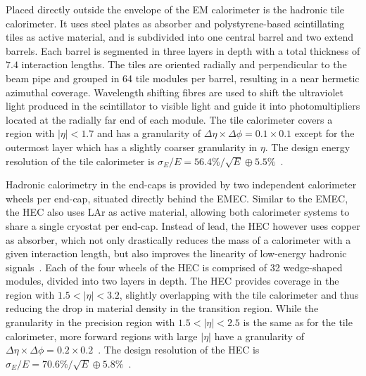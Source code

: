 Placed directly outside the envelope of the EM calorimeter is the hadronic tile calorimeter. It uses steel plates as absorber and polystyrene-based scintillating tiles as active material, and is subdivided into one central barrel and two extend barrels. Each barrel is segmented in three layers in depth with a total thickness of $7.4$ interaction lengths. The tiles are oriented radially and perpendicular to the beam pipe and grouped in 64 tile modules per barrel, resulting in a near hermetic azimuthal coverage. Wavelength shifting fibres are used to shift the ultraviolet light produced in the scintillator to visible light and guide it into photomultipliers located at the radially far end of each module. The tile calorimeter covers a region with $\vert\eta\vert <1.7$ and has a granularity of $\Delta \eta \times \Delta \phi = 0.1 \times 0.1$ except for the outermost layer which has a slightly coarser granularity in $\eta$. The design energy resolution of the tile calorimeter is $\sigma_E / E = 56.4\% / \sqrt{E} \oplus 5.5\%$~\cite{Aad:2008zzm}.

Hadronic calorimetry in the end-caps is provided by two independent calorimeter wheels per end-cap, situated directly behind the EMEC. Similar to the EMEC, the HEC also uses LAr as active material, allowing both calorimeter systems to share a single cryostat per end-cap. Instead of lead, the HEC however uses copper as absorber, which not only drastically reduces the mass of a calorimeter with a given interaction length, but also improves the linearity of low-energy hadronic signals~\cite{Lee:2637852}. Each of the four wheels of the HEC is comprised of 32 wedge-shaped modules, divided into two layers in depth. The HEC provides coverage in the region with $1.5 < \vert\eta\vert <3.2$, slightly overlapping with the tile calorimeter and thus reducing the drop in material density in the transition region. While the granularity in the precision region with $1.5 < \vert\eta\vert <2.5$ is the same as for the tile calorimeter, more forward regions with large $\vert\eta\vert$ have a granularity of $\Delta \eta \times \Delta \phi = 0.2 \times 0.2$~\cite{Aad:2008zzm}. The design resolution of the HEC is $\sigma_E / E = 70.6\% / \sqrt{E} \oplus 5.8\%$~\cite{Aad:2008zzm}.


